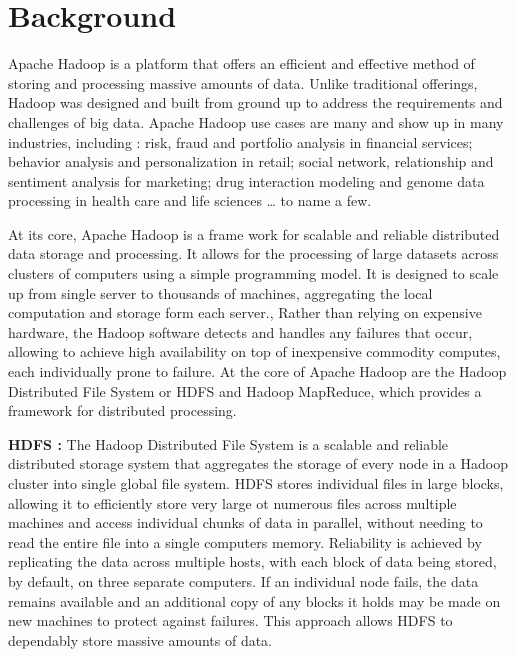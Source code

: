 \documentclass{osuthesis}
\begin{document}
				\section{Background}
				\par Apache Hadoop \cite{Hadoop2009} is a platform that offers an efficient and effective method of storing and processing massive amounts of data. Unlike traditional offerings, Hadoop was designed and built from ground up to address the requirements and challenges of big data. Apache Hadoop use cases are many and show up in many industries, including : risk, fraud and portfolio analysis in financial services; behavior analysis and personalization in retail; social network, relationship and sentiment analysis for marketing; drug interaction modeling and genome data processing in health care and life sciences … to name a few.
				\par At its core, Apache Hadoop is a frame work for scalable and reliable distributed data storage and processing. It allows for the processing of large datasets across clusters of computers using a simple programming model. It is designed to scale up from single server to thousands of machines, aggregating the local computation and storage form each server., Rather than relying on expensive hardware, the Hadoop software detects and handles any failures that occur, allowing to achieve high availability on top of inexpensive commodity computes, each individually prone to failure.
				At the core of Apache Hadoop are the Hadoop Distributed File System or HDFS and Hadoop MapReduce, which provides a framework for distributed processing.
				\par \textbf{HDFS :} The Hadoop Distributed File System \cite{Shvachko2010} is a scalable and reliable distributed storage system that aggregates the storage of every node in a Hadoop cluster into single global file system. HDFS stores individual files in large blocks, allowing it to efficiently store very large ot numerous files across multiple machines and access individual chunks of data in parallel, without needing to read the entire file into a single computers memory. Reliability is achieved by replicating the data across multiple hosts, with each block of data being stored, by default, on three separate computers. If an individual node fails, the data remains available and an additional copy of any blocks it holds may be made on new machines to protect against failures. This approach allows HDFS to dependably store massive amounts of data.
\end{document}
